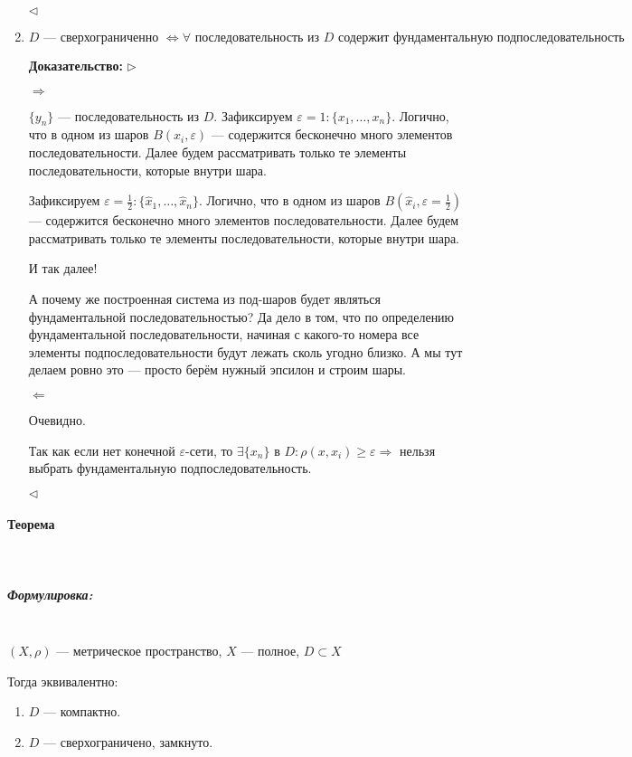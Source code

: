 \documentclass{article}
\let\vanillaparagraph\paragraph
\let\vanillasubparagraph\subparagraph
\renewcommand{\paragraph}[1]{\vanillaparagraph{#1}\mbox{}\\}
\renewcommand{\subparagraph}[1]{\vanillasubparagraph{#1}\mbox{}\\}
\begin{document}
\begin{enumerate}
    $\lhd$

    
    \item $D\text{ --- сверхограниченно }\Leftrightarrow \forall\text{ последовательность из $D$ содержит фундаментальную подпоследовательность}$
    
  \textbf{Доказательство:}
    $\rhd$
    
    $\Rightarrow$
    
    $\{y_n\}$ --- последовательность из $D$. Зафиксируем $\varepsilon = 1 : \{x_1, \ldots, x_n\}$. Логично, что в одном из шаров $B(x_i, \varepsilon)$ --- содержится бесконечно много элементов последовательности. Далее будем рассматривать только те элементы последовательности, которые внутри шара.
    
    Зафиксируем $\varepsilon = \frac{1}{2} : \{\hat{x}_1, \ldots, \hat{x}_n\}$. Логично, что в одном из шаров $B(\hat{x}_i, \varepsilon = \frac{1}{2})$ --- содержится бесконечно много элементов последовательности. Далее будем рассматривать только те элементы последовательности, которые внутри шара.
    
    И так далее!
    
    А почему же построенная система из под-шаров будет являться фундаментальной последовательностью? Да дело в том, что по определению фундаментальной последовательности, начиная с какого-то номера все элементы подпоследовательности будут лежать сколь угодно близко. А мы тут делаем ровно это --- просто берём нужный эпсилон и строим шары.
    
    $\Leftarrow$
    
    Очевидно. \Smiley
    
    Так как если нет конечной $\varepsilon$-сети, то $\exists \{x_n\}$ в $D : \rho(x, x_i) \ge \varepsilon \Rightarrow$ нельзя выбрать фундаментальную подпоследовательность. 

    $\lhd$
\end{enumerate}

\paragraph{Теорема}

\subparagraph{Формулировка:}

$(X, \rho)$ --- метрическое пространство, $X$ --- полное, $D \subset X$

Тогда эквивалентно:

\begin{enumerate}
    \item $D$ --- компактно.
    \item $D$ --- сверхограничено, замкнуто.
\end{enumerate}
\end{document}

